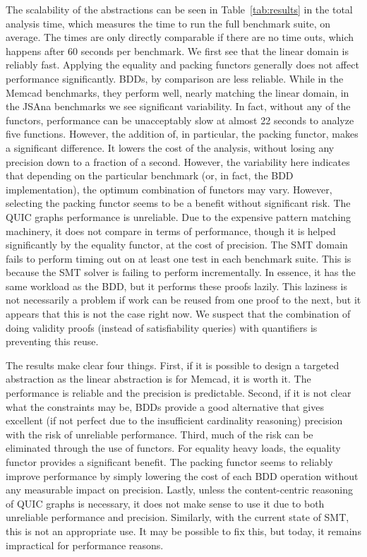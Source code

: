 The scalability of the abstractions can be seen in Table~\ref{tab:results} in the total analysis time, which measures the time to run the full benchmark suite, on average.  The times are only directly comparable if there are no time outs, which happens after 60 seconds per benchmark.  We first see that the linear domain is reliably fast.  Applying the equality and packing functors generally does not affect performance significantly.  BDDs, by comparison are less reliable.  While in the Memcad benchmarks, they perform well, nearly matching the linear domain, in the JSAna benchmarks we see significant variability.  In fact, without any of the functors, performance can be unacceptably slow at almost 22 seconds to analyze five functions.  However, the addition of, in particular, the packing functor, makes a significant difference.  It lowers the cost of the analysis, without losing any precision down to a fraction of a second.  However, the variability here indicates that depending on the particular benchmark (or, in fact, the BDD implementation), the optimum combination of functors may vary.  However, selecting the packing functor seems to be a benefit without significant risk.  The QUIC graphs performance is unreliable.  Due to the expensive pattern matching machinery, it does not compare in terms of performance, though it is helped significantly by the equality functor, at the cost of precision.  The SMT domain fails to perform timing out on at least one test in each benchmark suite.  This is because the SMT solver is failing to perform incrementally.  In essence, it has the same workload as the BDD, but it performs these proofs lazily.  This laziness is not necessarily a problem if work can be reused from one proof to the next, but it appears that this is not the case right now.  We suspect that the combination of doing validity proofs (instead of satisfiability queries) with quantifiers is preventing this reuse.

The results make clear four things.  First, if it is possible to design a targeted abstraction as the linear abstraction is for Memcad, it is worth it.  The performance is reliable and the precision is predictable.  Second, if it is not clear what the constraints may be, BDDs provide a good alternative that gives excellent (if not perfect due to the insufficient cardinality reasoning) precision with the risk of unreliable performance.  Third, much of the risk can be eliminated through the use of functors.  For equality heavy loads, the equality functor provides a significant benefit.  The packing functor seems to reliably improve performance by simply lowering the cost of each BDD operation without any measurable impact on precision.  Lastly, unless the content-centric reasoning of QUIC graphs is necessary, it does not make sense to use it due to both unreliable performance and precision.  Similarly, with the current state of SMT, this is not an appropriate use.  It may be possible to fix this, but today, it remains impractical for performance reasons.






